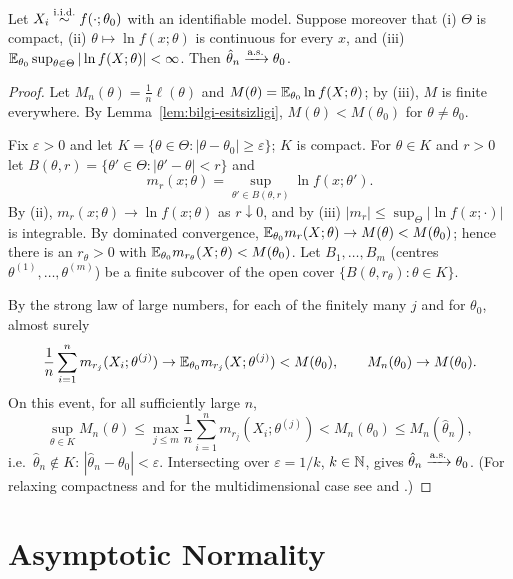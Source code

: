 \documentclass[main.tex]{subfiles}
\begin{document}
\begin{theorem}\label{thm:mle-tutarli}
Let $X_i\overset{\text{i.i.d.}}{\sim} f(\cdot;\theta_0)$ with an identifiable model. Suppose moreover that (i) $\Theta$ is compact, (ii) $\theta\mapsto\ln f(x;\theta)$ is continuous for every $x$, and (iii) $\mathbb{E}_{\theta_0}\sup_{\theta\in\Theta}|\ln f(X;\theta)|<\infty$. Then $\hat\theta_n\xrightarrow{\text{a.s.}}\theta_0$.
\end{theorem}
\begin{proof}
Let $M_n(\theta)=\frac1n\ell(\theta)$ and $M(\theta)=\mathbb{E}_{\theta_0}\ln f(X;\theta)$; by (iii), $M$ is finite everywhere. By Lemma~\ref{lem:bilgi-esitsizligi}, $M(\theta)<M(\theta_0)$ for $\theta\ne\theta_0$.

Fix $\varepsilon>0$ and let $K=\{\theta\in\Theta:|\theta-\theta_0|\ge\varepsilon\}$; $K$ is compact. For $\theta\in K$ and $r>0$ let $B(\theta,r)=\{\theta'\in\Theta:|\theta'-\theta|<r\}$ and
\[
m_r(x;\theta)=\sup_{\theta'\in B(\theta,r)}\ln f(x;\theta').
\]
By (ii), $m_r(x;\theta)\to\ln f(x;\theta)$ as $r\downarrow0$, and by (iii) $|m_r|\le\sup_{\Theta}|\ln f(x;\cdot)|$ is integrable. By dominated convergence, $\mathbb{E}_{\theta_0}m_r(X;\theta)\to M(\theta)<M(\theta_0)$; hence there is an $r_\theta>0$ with $\mathbb{E}_{\theta_0}m_{r_\theta}(X;\theta)<M(\theta_0)$. Let $B_1,\dots,B_m$ (centres $\theta^{(1)},\dots,\theta^{(m)}$) be a finite subcover of the open cover $\{B(\theta,r_\theta):\theta\in K\}$.

By the strong law of large numbers, for each of the finitely many $j$ and for $\theta_0$, almost surely
\[
\frac1n\sum_{i=1}^n m_{r_j}(X_i;\theta^{(j)})\to\mathbb{E}_{\theta_0}m_{r_j}(X;\theta^{(j)})<M(\theta_0),\qquad M_n(\theta_0)\to M(\theta_0).
\]
On this event, for all sufficiently large $n$,
\[
\sup_{\theta\in K}M_n(\theta)\le\max_{j\le m}\frac1n\sum_{i=1}^nm_{r_j}(X_i;\theta^{(j)})<M_n(\theta_0)\le M_n(\hat\theta_n),
\]
i.e.\ $\hat\theta_n\notin K$: $|\hat\theta_n-\theta_0|<\varepsilon$. Intersecting over $\varepsilon=1/k$, $k\in\mathbb{N}$, gives $\hat\theta_n\xrightarrow{\text{a.s.}}\theta_0$. (For relaxing compactness and for the multidimensional case see \cite[Theorems~5.7 and 5.14]{vdv} and \cite[Chapter~17]{ferguson}.)
\end{proof}

\section{Asymptotic Normality}
\end{document}
